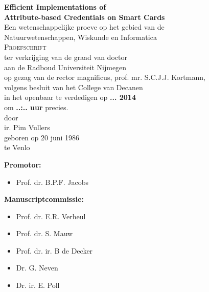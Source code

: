 \thispagestyle{empty}

\begin{center}
  \textbf{\Large Efficient Implementations of\\ Attribute-based Credentials on Smart Cards}\\[15mm]

  Een wetenschappelijke proeve op het gebied van de \\
  Natuurwetenschappen, Wiskunde en Informatica \\[15mm]

  \textsc{Proefschrift} \\[15mm]

  ter verkrijging van de graad van doctor \\
  aan de Radboud Universiteit Nijmegen \\
  op gezag van de rector magnificus, prof. mr. S.C.J.J. Kortmann, \\
  volgens besluit van het College van Decanen \\
  in het openbaar te verdedigen op \textbf{... 2014} \\
  om \textbf{..:.. uur} precies. \\[30mm]

  door \\[30mm]

  ir. Pim Vullers \\[15mm]

  geboren op 20 juni 1986 \\
  te Venlo
\end{center}

\clearpage

\thispagestyle{empty}

\textbf{Promotor:}
\begin{itemize}
  \item[~] Prof. dr. B.P.F. Jacobs
\end{itemize}

\textbf{Manuscriptcommissie:}
\begin{itemize}
  \item[~] Prof. dr. E.R. Verheul
  \item[~] Prof. dr. S. Mauw
  \item[~] Prof. dr. ir. B de Decker
  \item[~] Dr. G. Neven
  \item[~] Dr. ir. E. Poll
\end{itemize}